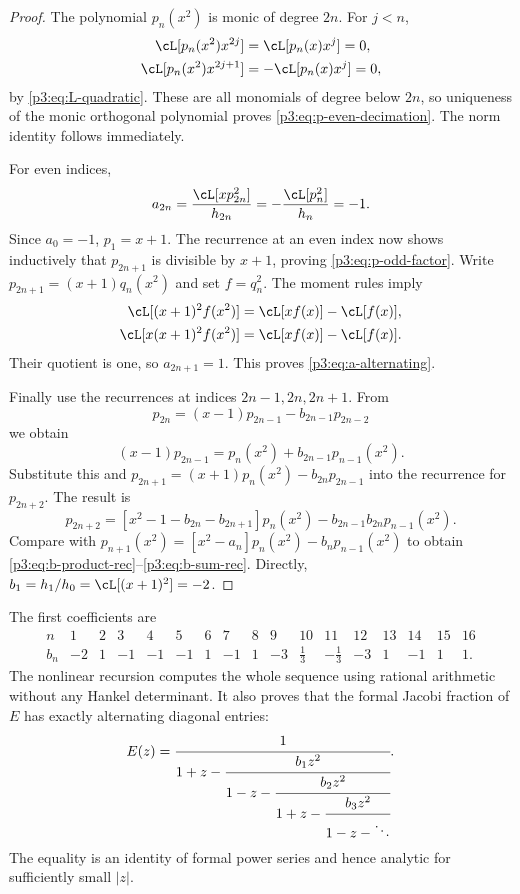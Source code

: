 \documentclass[11pt,oneside]{article}
\theoremstyle{definition}
\begin{document}
\begin{proof}
The polynomial \(p_n(x^2)\) is monic of degree \(2n\).  For \(j<n\),
\begin{align*}
 \cL[p_n(x^2)x^{2j}]&=\cL[p_n(x)x^j]=0,\\
 \cL[p_n(x^2)x^{2j+1}]&=-\cL[p_n(x)x^j]=0,
\end{align*}
by \eqref{p3:eq:L-quadratic}.  These are all monomials of degree below \(2n\), so uniqueness
of the monic orthogonal polynomial proves \eqref{p3:eq:p-even-decimation}.  The norm identity
follows immediately.

For even indices,
\[
 a_{2n}=\frac{\cL[xp_{2n}^2]}{h_{2n}}
 =-\frac{\cL[p_n^2]}{h_n}=-1.
\]
Since \(a_0=-1\), \(p_1=x+1\).  The recurrence at an even index now shows inductively that
\(p_{2n+1}\) is divisible by \(x+1\), proving \eqref{p3:eq:p-odd-factor}.
Write \(p_{2n+1}=(x+1)q_n(x^2)\) and set \(f=q_n^2\).  The moment rules imply
\begin{align*}
 \cL[(x+1)^2f(x^2)]
 &=\cL[xf(x)]-\cL[f(x)],\\
 \cL[x(x+1)^2f(x^2)]
 &=\cL[xf(x)]-\cL[f(x)].
\end{align*}
Their quotient is one, so \(a_{2n+1}=1\).  This proves
\eqref{p3:eq:a-alternating}.

Finally use the recurrences at indices \(2n-1,2n,2n+1\).  From
\[
 p_{2n}=(x-1)p_{2n-1}-b_{2n-1}p_{2n-2}
\]
we obtain
\[
 (x-1)p_{2n-1}=p_n(x^2)+b_{2n-1}p_{n-1}(x^2).
\]
Substitute this and
\(
 p_{2n+1}=(x+1)p_n(x^2)-b_{2n}p_{2n-1}
\)
into the recurrence for \(p_{2n+2}\).  The result is
\[
 p_{2n+2}
 =[x^2-1-b_{2n}-b_{2n+1}]p_n(x^2)
 -b_{2n-1}b_{2n}p_{n-1}(x^2).
\]
Compare with
\(
 p_{n+1}(x^2)=[x^2-a_n]p_n(x^2)-b_np_{n-1}(x^2)
\)
to obtain \eqref{p3:eq:b-product-rec}--\eqref{p3:eq:b-sum-rec}.  Directly,
\(b_1=h_1/h_0=\cL[(x+1)^2]=-2\).
\end{proof}

The first coefficients are
\begin{equation}
\begin{array}{c|rrrrrrrrrrrrrrrr}
 n&1&2&3&4&5&6&7&8&9&10&11&12&13&14&15&16\\ \hline
 b_n&-2&1&-1&-1&-1&1&-1&1&-3&\frac13&-\frac13&-3&1&-1&1&1.
\end{array}                                                  \label{p3:eq:b-first-row}
\end{equation}
The nonlinear recursion computes the whole sequence using rational arithmetic without any
Hankel determinant.  It also proves that the formal Jacobi fraction of \(E\) has exactly
alternating diagonal entries:
\begin{equation}
 E(z)=\cfrac{1}{1+z-
 \cfrac{b_1z^2}{1-z-
 \cfrac{b_2z^2}{1+z-
 \cfrac{b_3z^2}{1-z-\ddots}}}}.                            \label{p3:eq:E-J-fraction}
\end{equation}
The equality is an identity of formal power series and hence analytic for sufficiently small
\(|z|\).
\end{document}
